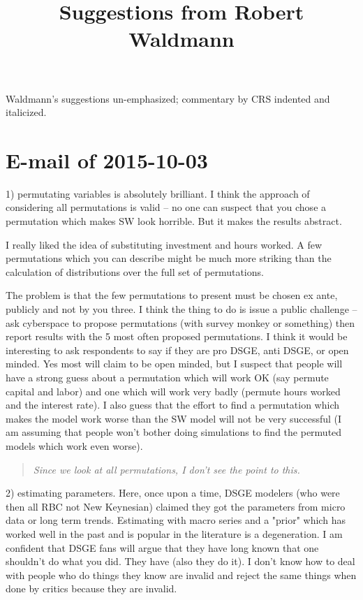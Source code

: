 \documentclass{article}
\begin{document}
\title{Suggestions from Robert Waldmann}
\author{}
\date{}
\maketitle

Waldmann's suggestions un-emphasized; commentary by CRS indented and italicized.

\section{E-mail of 2015-10-03}

1) permutating variables is absolutely brilliant.   I think the approach of considering all permutations is valid -- no one can suspect that you chose a permutation which makes SW look horrible.  But it makes the results abstract.

I really liked the idea of substituting investment and hours worked.   A few permutations which you can describe might be much more striking than the calculation of distributions over the full set of permutations.

The problem is that the few permutations to present must be chosen ex ante, publicly and not by you three.   I think the thing to do is issue a public challenge -- ask cyberspace to propose permutations (with survey monkey or something) then report results with the 5 most often proposed permutations.  I think it would be interesting to ask respondents to say if they are pro DSGE, anti DSGE, or open minded.  Yes most will claim to be open minded, but I suspect that people will have a strong guess about a permutation which will work OK (say permute capital and labor) and one which will work very badly (permute hours worked and the interest rate).  I also guess that the effort to find a permutation which makes the model work worse than the SW model will not be very successful (I am assuming that people won't bother doing simulations to find the permuted models which work even worse).

\begin{quotation}
{\em Since we look at all permutations, I don't see the point to this.}
\end{quotation}


2) estimating parameters.  Here, once upon a time, DSGE modelers (who were then all RBC not New Keynesian) claimed they got the parameters from micro data or long term trends.    Estimating with macro series and a "prior" which has worked well in the past and is popular in the literature is a degeneration.  I am confident that DSGE fans will argue that they have long known that one shouldn't do what you did.  They have (also they do it).  I don't know how to deal with people who do things they know are invalid and reject the same things when done by critics because they are invalid.
\end{document}
